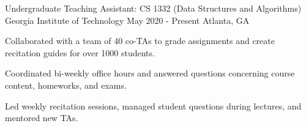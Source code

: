 \begin{cventries}
\cventry
{Undergraduate Teaching Assistant: CS 1332 (Data Structures and Algorithms)} %
{Georgia Institute of Technology} %
{May 2020 - Present} %
{Atlanta, GA} %
{ %
\begin{cvitems}
    \item Collaborated with a team of 40 co-TAs to grade assignments and create recitation guides for over 1000 students. 
    \item Coordinated bi-weekly office hours and answered
    questions concerning course content, homeworks, and exams.
    \item Led weekly recitation sessions, managed student questions during lectures, and mentored new TAs.
\end{cvitems}
}






\end{cventries}
